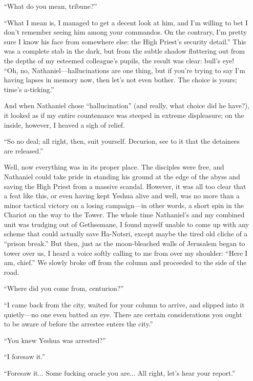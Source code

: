 ``What do you mean, tribune?''

``What I mean is, I managed to get a decent look at him, and I'm willing to bet I don't remember seeing him among your commandos. On the contrary, I'm pretty sure I know his face from somewhere else: the High Priest's security detail.'' This was a complete stab in the dark, but from the subtle shadow fluttering out from the depths of my esteemed colleague's pupils, the result was clear: bull's eye! ``Oh, no, Nathaniel---hallucinations are one thing, but if you're trying to say I'm having lapses in memory now, then let's not even bother. The choice is yours; time's a-ticking.''

And when Nathaniel chose ``hallucination'' (and really, what choice did he have?), it looked as if my entire countenance was steeped in extreme displeasure; on the inside, however, I heaved a sigh of relief.

``So no deal; all right, then, suit yourself. Decurion, see to it that the detainees are released.''

Well, now everything was in its proper place. The disciples were free, and Nathaniel could take pride in standing his ground at the edge of the abyss and saving the High Priest from a massive scandal. However, it was all too clear that a feat like this, or even having kept Yeshua alive and well, was no more than a minor tactical victory on a losing campaign---in other words, a short spin in the Chariot on the way to the Tower. The whole time Nathaniel's and my combined unit was trudging out of Gethsemane, I found myself unable to come up with any scheme that could actually save Ha-Notsri, except maybe the tired old cliche of a ``prison break.'' But then, just as the moon-bleached walls of Jerusalem began to tower over us, I heard a voice softly calling to me from over my shoulder: ``Here I am, chief.'' We slowly broke off from the column and proceeded to the side of the road.

``Where did you come from, centurion?''

``I came back from the city, waited for your column to arrive, and slipped into it quietly---no one even batted an eye. There are certain considerations you ought to be aware of before the arrestee enters the city.''

``You knew Yeshua was arrested?''

``I foresaw it.''

``Foresaw it... Some fucking oracle you are... All right, let's hear your report.''

